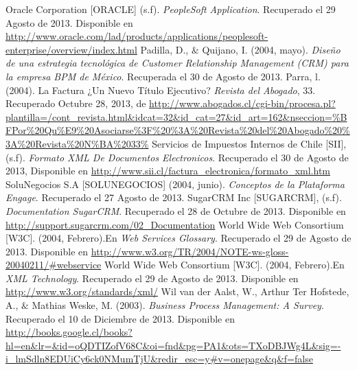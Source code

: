 \newline
Oracle Corporation [ORACLE] (s.f). \textit{PeopleSoft Application}. Recuperado el 29 Agosto de 2013. Disponible en \url{http://www.oracle.com/lad/products/applications/peoplesoft-enterprise/overview/index.html}
\newline
\newline
Padilla, D., $\&$ Quijano, I. (2004, mayo). \textit{Diseño de una estrategia tecnológica de Customer Relationship Management (CRM) para la empresa BPM de México}. Recuperada el 30 de Agosto de 2013.
\newline
\newline
Parra, l. (2004). La Factura ¿Un Nuevo Título Ejecutivo? \textit{Revista del Abogado}, 33. Recuperado Octubre 28, 2013, de \url{http://www.abogados.cl/cgi-bin/procesa.pl?plantilla=/cont_revista.html&idcat=32&id_cat=27&id_art=162&nseccion=%BFPor%20Qu%E9%20Asociarse%3F%20%3A%20Revista%20del%20Abogado%20%3A%20Revista%20N%BA%2033%}
\newline
\newline
Servicios de Impuestos Internos de Chile [SII], (s.f). \textit{Formato XML De Documentos Electronicos}. Recuperado el 30 de Agosto de 2013, Disponible en \url{http://www.sii.cl/factura_electronica/formato_xml.htm}
\newline
\newline
SoluNegocios S.A [SOLUNEGOCIOS] (2004, junio). \textit{Conceptos de la Plataforma Engage}. Recuperado el 27 Agosto de 2013.
\newline
\newline
SugarCRM Inc [SUGARCRM], (s.f). \textit{Documentation SugarCRM}. Recuperado el 28 de Octubre de 2013. Disponible en \url{http://support.sugarcrm.com/02_Documentation}
\newline
\newline
World Wide Web Consortium [W3C]. (2004, Febrero).En \textit{Web Services Glossary}. Recuperado el 29 de Agosto de 2013. Disponible en \url{http://www.w3.org/TR/2004/NOTE-ws-gloss-20040211/#webservice}
\newline
\newline
World Wide Web Consortium [W3C]. (2004, Febrero).En \textit{XML Technology}. Recuperado el 29 de Agosto de 2013. Disponible en \url{http://www.w3.org/standards/xml/}
\newline
\newline
Wil van der Aalst, W., Arthur Ter Hofstede, A., $\&$ Mathias Weske, M. (2003). \textit{Business Process Management: A Survey}. Recuperado el 10 de Diciembre de 2013. Disponible en  \url{http://books.google.cl/books?hl=en&lr=&id=oQDTIZofV68C&oi=fnd&pg=PA1&ots=TXoDBJWg4L&sig=-i_lmSdln8EDUiCy6ck0NMumTjU&redir_esc=y#v=onepage&q&f=false}




